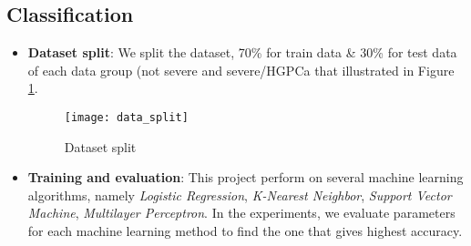 \documentclass[a4paper,oneside]{article}
\begin{document}
\subsection{Classification}
\begin{itemize}
\item \textbf{Dataset split}: We split the dataset, 70\% for train data \& 30\% for test data of each data group (not severe and severe/HGPCa that illustrated in Figure \ref{fig:data_split}.
\begin{figure}
  \texttt{[image: data\_split]}
  \centering
  \caption{Dataset split}
  \label{fig:data_split}
\end{figure}
\item \textbf{Training and evaluation}: This project perform on several machine learning algorithms, namely \textit{Logistic Regression}, \textit{K-Nearest Neighbor}, \textit{Support Vector Machine}, \textit{Multilayer Perceptron}. In the experiments, we evaluate parameters for each machine learning method to find the one that gives highest accuracy.
\end{itemize}
\end{document}
